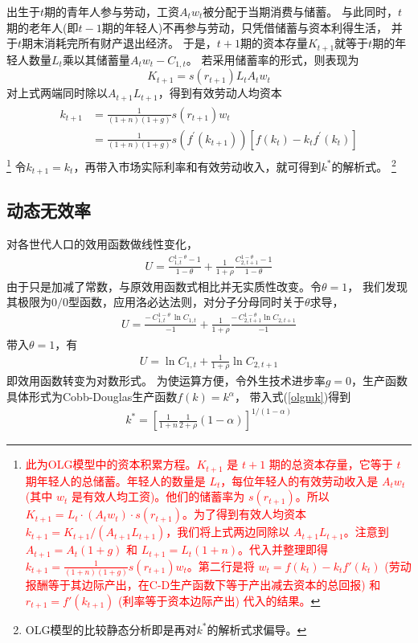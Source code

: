 \documentclass[cn,normal,11pt,black]{elegantnote}
\begin{document}
出生于$t$期的青年人参与劳动，工资$A_t w_t$被分配于当期消费与储蓄。
与此同时，$t$期的老年人(即$t-1$期的年轻人)不再参与劳动，只凭借储蓄与资本利得生活，
并于$t$期末消耗完所有财产退出经济。
于是，$t+1$期的资本存量$K_{t+1}$就等于$t$期的年轻人数量$L_t$乘以其储蓄量$A_t w_t - C_{1,t}$。
若采用储蓄率的形式，则表现为
    \begin{equation}
        K_{t+1} = s(r_{t+1}) L_t A_t w_t
    \end{equation}
对上式两端同时除以$A_{t+1} L_{t+1}$，得到有效劳动人均资本
\begin{align}
    \begin{aligned} \label{olgmk}
        k_{t+1} & = \frac{1}{(1+n)(1+g)} s(r_{t+1}) w_t \\
                & = \frac{1}{(1+n)(1+g)} s(f^\prime(k_{t+1})) \left[f(k_t) - k_t f^\prime(k_{t})\right]
    \end{aligned}
\end{align}\footnote{\textcolor{red}{此为OLG模型中的资本积累方程。$K_{t+1}$ 是 $t+1$ 期的总资本存量，它等于 $t$ 期年轻人的总储蓄。年轻人的数量是 $L_t$，每位年轻人的有效劳动收入是 $A_t w_t$ (其中 $w_t$ 是有效人均工资)。他们的储蓄率为 $s(r_{t+1})$。所以 $K_{t+1} = L_t \cdot (A_t w_t) \cdot s(r_{t+1})$。为了得到有效人均资本 $k_{t+1} = K_{t+1}/(A_{t+1}L_{t+1})$，我们将上式两边同除以 $A_{t+1}L_{t+1}$。注意到 $A_{t+1} = A_t(1+g)$ 和 $L_{t+1} = L_t(1+n)$。代入并整理即得 $k_{t+1} = \frac{1}{(1+n)(1+g)} s(r_{t+1}) w_t$。第二行是将 $w_t = f(k_t) - k_t f'(k_t)$ (劳动报酬等于其边际产出，在C-D生产函数下等于产出减去资本的总回报) 和 $r_{t+1} = f'(k_{t+1})$ (利率等于资本边际产出) 代入的结果。}}
令$k_{t+1} = k_t$，再带入市场实际利率和有效劳动收入，就可得到$k^*$的解析式。
\footnote{OLG模型的比较静态分析即是再对$k^*$的解析式求偏导。}

\subsection{动态无效率}

对各世代人口的效用函数做线性变化，
\begin{align}
    U = \frac{C_{1,t}^{1-\theta} -1}{1-\theta} + \frac{1}{1+\rho} \frac{C_{2, t+1}^{1-\theta} -1}{1-\theta}
\end{align}
由于只是加减了常数，与原效用函数式相比并无实质性改变。令$\theta =1$，
我们发现其极限为$0/0$型函数，应用洛必达法则，对分子分母同时关于$\theta$求导，
\begin{align}
U = \frac{- \, C_{1,t}^{1-\theta} \, \ln C_{1,t}}{-1} + \frac{1}{1+\rho} \frac{- \, C_{2, t+1}^{1-\theta} \ln C_{2,t+1}}{-1}
\end{align}
带入$\theta =1$，有
\begin{align}
U =  \ln C_{1,t} + \frac{1}{1+\rho} \ln C_{2,t+1}
\end{align}
即效用函数转变为对数形式。
为使运算方便，令外生技术进步率$g=0$，生产函数具体形式为Cobb-Douglas生产函数$f(k)=k^\alpha$，
带入式(\ref{olgmk})得到
\begin{align}
k^{*}=\left[\frac{1}{1+n} \frac{1}{2+\rho}(1-\alpha)\right]^{1 /(1-\alpha)}
\end{align}
\end{document}
